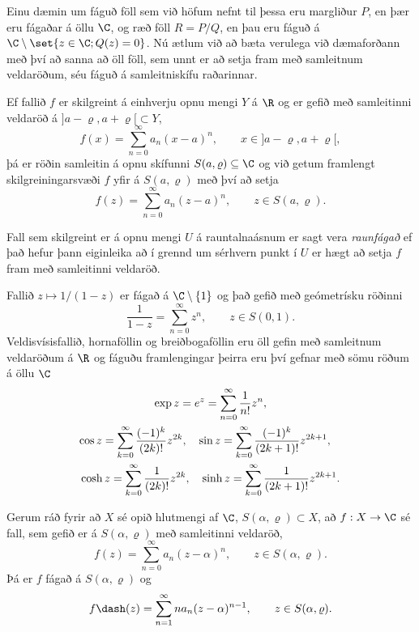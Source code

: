 \noindent
Einu dæmin um fáguð föll sem við höfum nefnt til þessa eru margliður
$P$, en þær eru fágaðar á öllu $\C$, og ræð föll $R=P/Q$, en þau eru
fáguð á $\C\setminus\set{z\in \C; Q(z)=0}$.  Nú ætlum við að bæta
verulega við dæmaforðann með því að sanna að öll föll, sem unnt er að
setja fram með samleitnum veldaröðum, séu fáguð á samleitniskífu
raðarinnar. 


Ef fallið $f$ er skilgreint á einhverju opnu mengi $Y$ á $\R$ og er
gefið með samleitinni veldaröð á $]a-{\varrho},a+{\varrho}[\subset Y$,
$$
f(x)=\sum\limits_{n=0}^{\infty} a_n(x-a)^n, \qquad 
x\in  ]a-{\varrho},a+{\varrho}[,
$$
þá er röðin samleitin á opnu skífunni $S(a,{\varrho})\subseteq \C$ og við getum 
framlengt skilgreiningarsvæði $f$ yfir á $S(a,{\varrho})$ með því að setja
$$
f(z)=\sum\limits_{n=0}^{\infty} a_n(z-a)^n, \qquad 
z\in  S(a,{\varrho}).
$$

\begin{sk}  Fall sem skilgreint er á opnu mengi $U$ á rauntalnaásnum
er sagt vera {\it raunfágað } ef það  hefur þann eiginleika að  
í grennd um sérhvern punkt í $U$ er hægt að setja $f$ fram með
samleitinni  veldaröð.
\end{sk}

Fallið $z\mapsto 1/(1-z)$ er fágað á $\C\setminus\{1\}$ og það 
gefið með geómetrísku röðinni
$$
\dfrac 1{1-z}=\sum_{n=0}^\infty z^n, \qquad z\in S(0,1). 
$$
Veldisvísisfallið, hornaföllin og breiðbogaföllin eru öll gefin með
samleitnum veldaröðum á $\R$ og fáguðu framlengingar þeirra eru því 
gefnar með sömu röðum á öllu $\C$
\begin{gather*}
\exp z =e\sp z = \sum_{n=0}^\infty \dfrac 1{n!}z^n, \\
\cos z = \sum_{k=0}\sp \infty \dfrac {(-1)\sp k}{(2k)!}z\sp{2k}, \quad
\sin z = \sum_{k=0}\sp \infty \dfrac {(-1)\sp k}{(2k+1)!}z\sp{2k+1},
\quad\\
\cosh z = \sum_{k=0}\sp \infty \dfrac {1}{(2k)!}z\sp{2k}, \quad
\sinh z = \sum_{k=0}\sp \infty \dfrac {1}{(2k+1)!}z\sp{2k+1}.
\end{gather*}


\begin{se}\label{set4.3.1} Gerum ráð fyrir að $X$ sé opið hlutmengi af $\C$, 
$S(\alpha,\varrho)\subset X$, að $f:X\to \C$
sé fall, sem  gefið er á $S(\alpha,\varrho)$ með samleitinni veldaröð,
 $$f(z)=\sum_{n=0}^\infty a_n(z-\alpha)^n, \qquad z\in S(\alpha,\varrho).
 $$
Þá er $f$ fágað á $S(\alpha,\varrho)$ og
 $$f\dash(z)=\sum_{n=1}^\infty na_n(z-\alpha)^{n-1}, \qquad z\in
S(\alpha,\varrho). 
 $$
\end{se}

